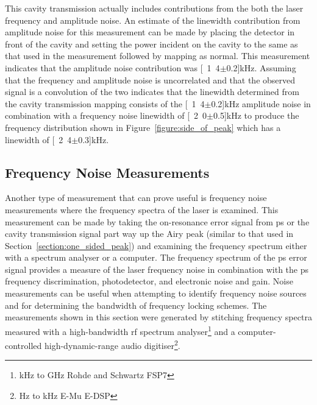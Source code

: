 This cavity transmission actually includes contributions from the both the laser frequency and amplitude noise.
An estimate of the linewidth contribution from amplitude noise for this measurement can be made by placing the detector in front of the cavity and setting the power incident on the cavity to the same as that used in the measurement followed by mapping as normal.
This measurement indicates that the amplitude noise contribution was \unit[1.4$\pm$0.2]{kHz}.
Assuming that the frequency and amplitude noise is uncorrelated and that the observed signal is a convolution of the two indicates that the linewidth determined from the cavity transmission mapping consists of the \unit[1.4$\pm$0.2]{kHz} amplitude noise in combination with a frequency noise linewidth of \unit[2.0$\pm$0.5]{kHz} to produce the frequency distribution shown in Figure~\ref{figure:side_of_peak} which has a linewidth of \unit[2.4$\pm$0.3]{kHz}.

\subsection{Frequency Noise Measurements}

Another type of measurement that can prove useful is frequency noise measurements where the frequency spectra of the laser is examined.
This measurement can be made by taking the on-resonance error signal from \gls{ps} or the cavity transmission signal part way up the Airy peak (similar to that used in Section~\ref{section:one_sided_peak}) and examining the frequency spectrum either with a spectrum analyser or a computer.
The frequency spectrum of the \gls{ps} error signal provides a measure of the laser frequency noise in combination with the \gls{ps} frequency discrimination, photodetector, and electronic noise and gain.
Noise measurements can be useful when attempting to identify frequency noise sources and for determining the bandwidth of frequency locking schemes.
The measurements shown in this section were generated by stitching frequency spectra measured with a high-bandwidth \gls{rf} spectrum analyser\footnote{\unit[9]{kHz} to \unit[7]{GHz} Rohde and Schwartz FSP7} and a computer-controlled high-dynamic-range audio digitiser\footnote{\unit[24]{Hz} to \unit[100]{kHz} E-Mu E-DSP}.

